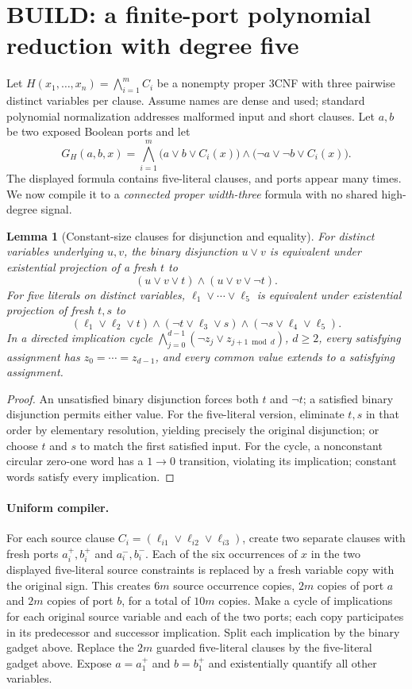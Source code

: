 \documentclass[11pt]{article}
\newtheorem{lemma}[theorem]{Lemma}
\begin{document}
\section{BUILD: a finite-port polynomial reduction with degree five}
Let $H(x_1,\ldots,x_n)=\bigwedge_{i=1}^m C_i$ be a nonempty proper 3CNF with three pairwise distinct variables per clause. Assume names are dense and used; standard polynomial normalization addresses malformed input and short clauses. Let $a,b$ be two exposed Boolean ports and let
\[
 G_H(a,b,x)=\bigwedge_{i=1}^m
 \bigl(a\vee b\vee C_i(x)\bigr)
 \wedge\bigl(\neg a\vee\neg b\vee C_i(x)\bigr).
\]
The displayed formula contains five-literal clauses, and ports appear many times. We now compile it to a \emph{connected proper width-three} formula with no shared high-degree signal.

\begin{lemma}[Constant-size clauses for disjunction and equality]
For distinct variables underlying $u,v$, the binary disjunction $u\vee v$ is equivalent under existential projection of a fresh $t$ to
\[(u\vee v\vee t)\wedge(u\vee v\vee\neg t).\]
For five literals on distinct variables, $\ell_1\vee\cdots\vee\ell_5$ is equivalent under existential projection of fresh $t,s$ to
\[(\ell_1\vee\ell_2\vee t)\wedge(\neg t\vee\ell_3\vee s)\wedge(\neg s\vee\ell_4\vee\ell_5).\]
In a directed implication cycle $\bigwedge_{j=0}^{d-1}(\neg z_j\vee z_{j+1\bmod d})$, $d\ge2$, every satisfying assignment has $z_0=\cdots=z_{d-1}$, and every common value extends to a satisfying assignment.
\end{lemma}
\begin{proof}
An unsatisfied binary disjunction forces both $t$ and $\neg t$; a satisfied binary disjunction permits either value. For the five-literal version, eliminate $t,s$ in that order by elementary resolution, yielding precisely the original disjunction; or choose $t$ and $s$ to match the first satisfied input. For the cycle, a nonconstant circular zero-one word has a $1\rightarrow0$ transition, violating its implication; constant words satisfy every implication.
\end{proof}

\paragraph{Uniform compiler.}
For each source clause $C_i=(\ell_{i1}\vee\ell_{i2}\vee\ell_{i3})$, create two separate clauses with fresh ports $a_i^{+},b_i^{+}$ and $a_i^{-},b_i^{-}$. Each of the six occurrences of $x$ in the two displayed five-literal source constraints is replaced by a fresh variable copy with the original sign. This creates $6m$ source occurrence copies, $2m$ copies of port $a$ and $2m$ copies of port $b$, for a total of $10m$ copies. Make a cycle of implications for each original source variable and each of the two ports; each copy participates in its predecessor and successor implication. Split each implication by the binary gadget above. Replace the $2m$ guarded five-literal clauses by the five-literal gadget above. Expose $a=a_1^+$ and $b=b_1^+$ and existentially quantify all other variables.
\end{document}
